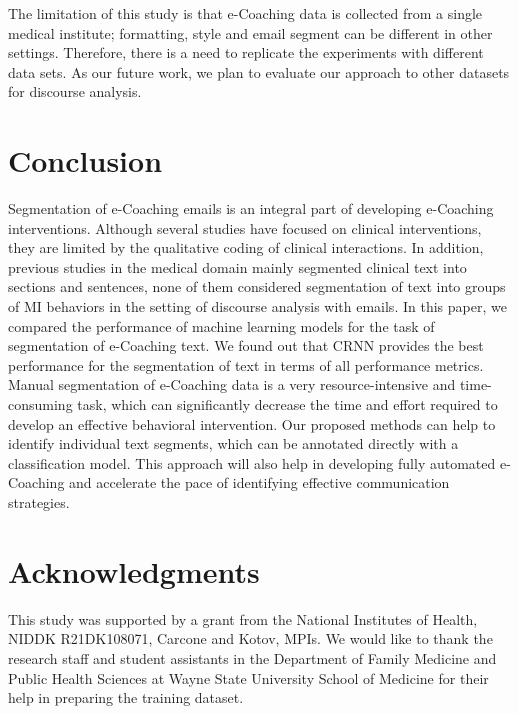 \documentclass{amia}
\begin{document}
The limitation of this study is that e-Coaching data is collected from a single medical institute; formatting, style and email segment can be different in other settings. Therefore, there is a need to replicate the experiments with different data sets. As our future work, we plan to evaluate our approach to other datasets for discourse analysis. 
 
\section*{Conclusion}
Segmentation of e-Coaching emails is an integral part of developing e-Coaching interventions. Although several studies have focused on clinical interventions, they are limited by the qualitative coding of clinical interactions. In addition, previous studies in the medical domain mainly segmented clinical text into sections and sentences, none of them considered segmentation of text into groups of MI behaviors in the setting of discourse analysis with emails. In this paper, we compared the performance of machine learning models for the task of segmentation of e-Coaching text. We found out that CRNN provides the best performance for the segmentation of text in terms of all performance metrics. Manual segmentation of e-Coaching data is a very resource-intensive and time-consuming task, which can significantly decrease the time and effort required to develop an effective behavioral intervention. Our proposed methods can help to identify individual text segments, which can be annotated directly with a classification model. This approach will also help in developing fully automated e-Coaching and accelerate the pace of identifying effective communication strategies.

\section*{Acknowledgments}
This study was supported by a grant from the National Institutes of Health, NIDDK R21DK108071, Carcone and Kotov, MPIs. We would like to thank the research staff and student assistants in the Department of Family Medicine and Public Health Sciences at Wayne State University School of Medicine for their help in preparing the training dataset. 



\end{document}
